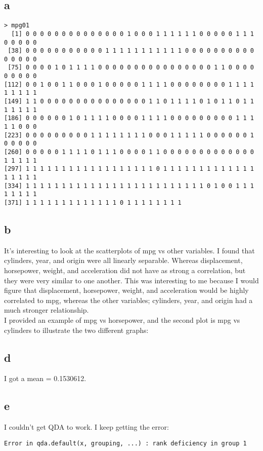 \documentclass{article}
\begin{document}
\subsection*{a}
\begin{verbatim}
> mpg01
  [1] 0 0 0 0 0 0 0 0 0 0 0 0 0 0 1 0 0 0 1 1 1 1 1 1 0 0 0 0 0 1 1 1 0 0 0 0 0
 [38] 0 0 0 0 0 0 0 0 0 0 0 1 1 1 1 1 1 1 1 1 1 1 0 0 0 0 0 0 0 0 0 0 0 0 0 0 0
 [75] 0 0 0 0 1 0 1 1 1 1 0 0 0 0 0 0 0 0 0 0 0 0 0 0 0 0 1 1 0 0 0 0 0 0 0 0 0
[112] 0 0 1 0 0 1 1 0 0 0 1 0 0 0 0 0 1 1 1 1 0 0 0 0 0 0 0 0 1 1 1 1 1 1 1 1 1
[149] 1 1 0 0 0 0 0 0 0 0 0 0 0 0 0 0 0 1 1 0 1 1 1 1 0 1 0 1 1 0 1 1 1 1 1 1 1
[186] 0 0 0 0 0 0 1 0 1 1 1 1 0 0 0 0 1 1 1 1 0 0 0 0 0 0 0 0 0 1 1 1 1 1 0 0 0
[223] 0 0 0 0 0 0 0 0 0 1 1 1 1 1 1 1 1 0 0 0 1 1 1 1 1 0 0 0 0 0 0 1 0 0 0 0 0
[260] 0 0 0 0 0 1 1 1 1 0 1 1 1 0 0 0 0 1 1 0 0 0 0 0 0 0 0 0 0 0 0 0 1 1 1 1 1
[297] 1 1 1 1 1 1 1 1 1 1 1 1 1 1 1 1 1 1 0 1 1 1 1 1 1 1 1 1 1 1 1 1 1 1 1 1 1
[334] 1 1 1 1 1 1 1 1 1 1 1 1 1 1 1 1 1 1 1 1 1 1 1 1 1 0 1 0 0 1 1 1 1 1 1 1 1
[371] 1 1 1 1 1 1 1 1 1 1 1 1 1 0 1 1 1 1 1 1 1 1
\end{verbatim}
\subsection*{b}
It's interesting to look at the scatterplots of mpg vs other variables. I found that cylinders, year, and origin were all linearly separable. Whereas displacement, horsepower, weight, and acceleration did not have as strong a correlation, but they were very similar to one another. This was interesting to me because I would figure that displacement, horsepower, weight, and acceleration would be highly correlated to mpg, whereas the other variables; cylinders, year, and origin had a much stronger relationship.\\
I provided an example of mpg vs horsepower, and the second plot is mpg vs cylinders to illustrate the two different graphs:\\




\subsection*{d}
I got a mean = 0.1530612.\\

\subsection*{e}
I couldn't get QDA to work. I keep getting the error:\\
\begin{verbatim}
Error in qda.default(x, grouping, ...) : rank deficiency in group 1
\end{verbatim}
\end{document}
